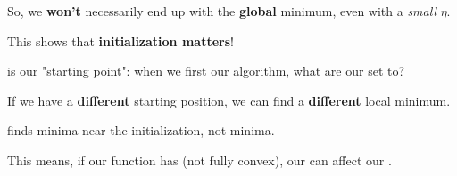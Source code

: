     So, we \textbf{won't} necessarily end up with the \textbf{global} minimum, even with a \textit{small} $\eta$.
    
    This shows that \textbf{initialization matters}!\\
    
    \begin{definition}
         is our "starting point": when we first  our algorithm, what are our  set to?
    \end{definition}
    
    If we have a \textbf{different} starting position, we can find a \textbf{different} local minimum.\\
    
    \begin{concept}
         finds  minima near the initialization, not  minima.
        
        This means, if our function has  (not fully convex), our  can affect our .
    \end{concept} 